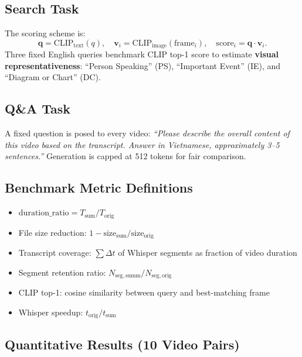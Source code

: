 \documentclass[10pt,conference]{IEEEtran}
\begin{document}
\subsection{Search Task}

The scoring scheme is:
\begin{equation}
  \mathbf{q} = \mathrm{CLIP}_{\text{text}}(q),\quad
  \mathbf{v}_i = \mathrm{CLIP}_{\text{image}}(\text{frame}_i),\quad
  \mathrm{score}_i = \mathbf{q} \cdot \mathbf{v}_i.
\end{equation}
Three fixed English queries benchmark CLIP top-1 score to estimate
\textbf{visual representativeness}: ``Person Speaking'' (PS), ``Important
Event'' (IE), and ``Diagram or Chart'' (DC).

\subsection{Q\&A Task}

A fixed question is posed to every video: \textit{``Please describe the
overall content of this video based on the transcript. Answer in Vietnamese,
approximately 3--5 sentences.''} Generation is capped at 512 tokens for fair
comparison.

\subsection{Benchmark Metric Definitions}

\begin{itemize}
  \item $\mathrm{duration\_ratio} = T_{\mathrm{sum}} / T_{\mathrm{orig}}$
  \item File size reduction: $1 - \mathrm{size}_{\mathrm{sum}} /
        \mathrm{size}_{\mathrm{orig}}$
  \item Transcript coverage: $\sum \Delta t$ of Whisper segments as fraction
        of video duration
  \item Segment retention ratio:
        $N_{\mathrm{seg,summ}} / N_{\mathrm{seg,orig}}$
  \item CLIP top-1: cosine similarity between query and best-matching frame
  \item Whisper speedup: $t_{\mathrm{orig}} / t_{\mathrm{sum}}$
\end{itemize}

\subsection{Quantitative Results (10 Video Pairs)}
\end{document}
